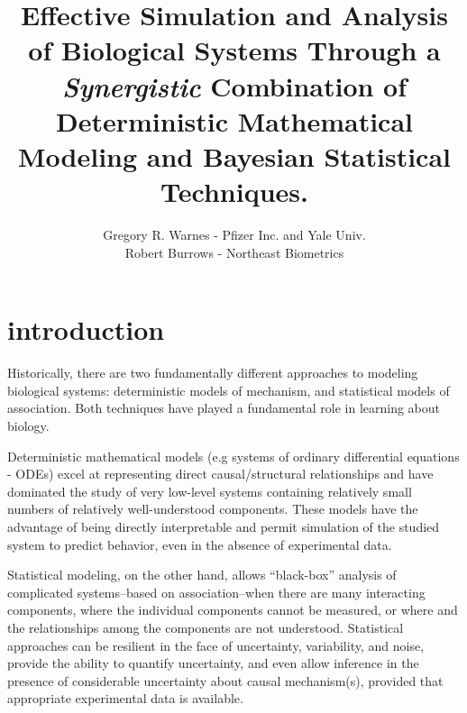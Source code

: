 \documentclass{article}
\title{
  Effective Simulation and Analysis of Biological Systems Through a
  \emph{Synergistic} Combination of Deterministic Mathematical
  Modeling and Bayesian Statistical Techniques.
}
\author{Gregory R. Warnes - Pfizer Inc. and Yale Univ. \\ 
        Robert Burrows - Northeast Biometrics }
\begin{document}
\maketitle

  
\section{introduction}

  Historically, there are two fundamentally different approaches to
  modeling biological systems: deterministic models of mechanism, and
  statistical models of association. Both techniques have played a
  fundamental role in learning about biology.
  
  Deterministic mathematical models (e.g systems of ordinary
  differential equations - ODEs) excel at representing direct
  causal/structural relationships and have dominated the study of
  very low-level systems containing relatively small numbers of
  relatively well-understood components.  These models have the
  advantage of being directly interpretable and permit simulation of
  the studied system to predict behavior, even in the absence of
  experimental data.
  
  Statistical modeling, on the other hand, allows ``black-box''
  analysis of complicated systems--based on association--when there are
  many interacting components, where the individual components cannot
  be measured, or where and the relationships among the components are
  not understood.  Statistical approaches can be resilient in the face
  of uncertainty, variability, and noise, provide the ability to
  quantify uncertainty, and even allow inference in the presence of
  considerable uncertainty about causal mechanism(s), provided that
  appropriate experimental data is available.
  
\end{document}
